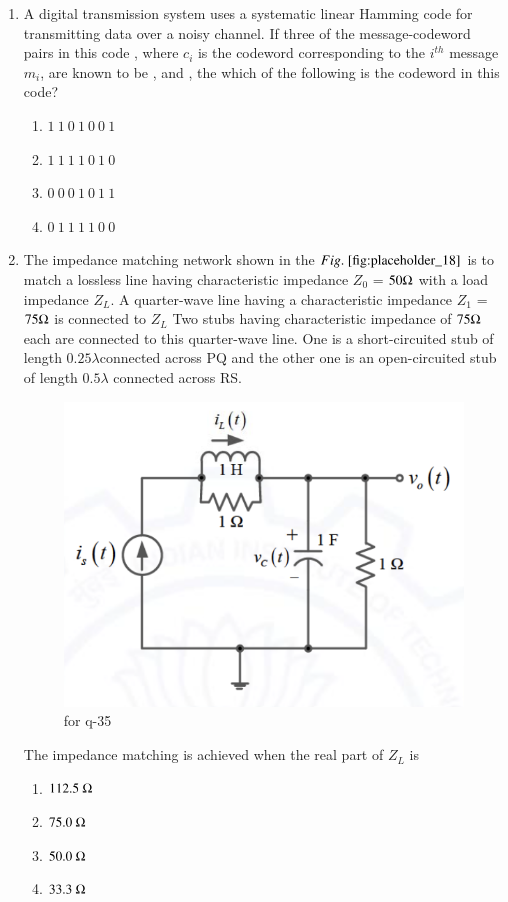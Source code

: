 \documentclass[journal,12pt,onecolumn]{IEEEtran}
\theoremstyle{remark}
\begin{document}
\begin{enumerate}
\item A digital transmission system uses a  systematic linear Hamming code for transmitting data over a noisy channel. If three of the message-codeword pairs in this code , where $c_i$ is the codeword corresponding to the $i^{th}$ message $m_i$, are known to be ,  and , the which of the following is the codeword in this code?
\begin{multicols}{4}
\begin{enumerate}
    \item $1 \ 1 \ 0 \ 1 \ 0 \ 0\ 1$
    \item $1 \ 1 \ 1 \ 1 \ 0 \ 1 \ 0$
    \item $0 \ 0 \ 0 \ 1 \ 0 \ 1 \ 1$
    \item $0 \ 1 \ 1 \ 1 \ 1 \ 0\ 0$
\end{enumerate}
\end{multicols}
\hfill {}

\item The impedance matching network shown in the $\figref{fig:placeholder_18}$ is to match a lossless line having characteristic impedance $Z_{0}$ = $50 \ohm$ with a load impedance $Z_{L}$. A quarter-wave line having a characteristic impedance $Z_{1}$ = $75 \ohm$ is connected to $Z_{L}$ Two stubs having characteristic impedance of $75 \ohm $ each are connected to this quarter-wave line. One is a short-circuited  stub of length $0.25 \lambda $connected across PQ and the other one is an open-circuited  stub of length $0.5 \lambda$ connected across RS.
\begin{figure}[H]
    \centering
    \includegraphics[width=0.4\columnwidth]{figs/17.png}
    \caption{\centering for q-35}
    \label{fig:placeholder_17}
\end{figure}
The impedance matching is achieved when the real part of $Z_L$ is 
\begin{multicols}{4}
\begin{enumerate}
    \item $112.5 \ \ohm$
    \item $75.0 \  \ohm$
    \item $50.0  \ \ohm$
    \item $33.3 \  \ohm$
\end{enumerate}
\end{multicols}
\hfill {}


\end{enumerate}
\end{document}
